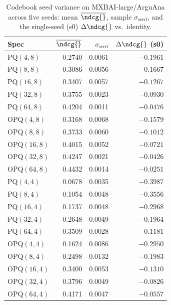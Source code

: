 \begin{table}[t]
\centering
\small
\caption{Codebook seed variance on MXBAI-large/ArguAna across five seeds: mean $\overline{\ndcg{}}$, sample $\sigma_{\text{seed}}$, and the single-seed (s0) $\Delta\ndcg{}$ vs.\ identity.}
\label{tab:seed-variance-mxbai-large-arguana}
\begin{tabular}{lrrr}
\toprule
Spec & $\overline{\ndcg{}}$ & $\sigma_{\text{seed}}$ & $\Delta\ndcg{}$ (s0) \\
\midrule
PQ$(4,8)$ & 0.2740 & 0.0061 & $-0.1961$ \\
PQ$(8,8)$ & 0.3086 & 0.0056 & $-0.1667$ \\
PQ$(16,8)$ & 0.3407 & 0.0057 & $-0.1267$ \\
PQ$(32,8)$ & 0.3755 & 0.0023 & $-0.0930$ \\
PQ$(64,8)$ & 0.4204 & 0.0011 & $-0.0476$ \\
OPQ$(4,8)$ & 0.3168 & 0.0068 & $-0.1579$ \\
OPQ$(8,8)$ & 0.3733 & 0.0060 & $-0.1012$ \\
OPQ$(16,8)$ & 0.4015 & 0.0052 & $-0.0721$ \\
OPQ$(32,8)$ & 0.4247 & 0.0021 & $-0.0426$ \\
OPQ$(64,8)$ & 0.4432 & 0.0014 & $-0.0251$ \\
PQ$(4,4)$ & 0.0678 & 0.0035 & $-0.3987$ \\
PQ$(8,4)$ & 0.1054 & 0.0048 & $-0.3556$ \\
PQ$(16,4)$ & 0.1737 & 0.0048 & $-0.2968$ \\
PQ$(32,4)$ & 0.2648 & 0.0049 & $-0.1964$ \\
PQ$(64,4)$ & 0.3509 & 0.0028 & $-0.1181$ \\
OPQ$(4,4)$ & 0.1624 & 0.0086 & $-0.2950$ \\
OPQ$(8,4)$ & 0.2498 & 0.0132 & $-0.1983$ \\
OPQ$(16,4)$ & 0.3400 & 0.0053 & $-0.1310$ \\
OPQ$(32,4)$ & 0.3796 & 0.0049 & $-0.0826$ \\
OPQ$(64,4)$ & 0.4171 & 0.0047 & $-0.0557$ \\
\bottomrule
\end{tabular}
\end{table}

